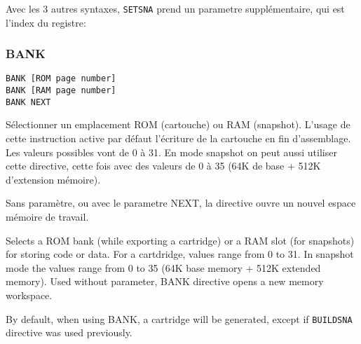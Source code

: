 \begin{xfr}
Avec les 3 autres syntaxes, \texttt{SETSNA} prend un parametre supplémentaire, qui est l'index du registre:
\end{xfr}














\subsubsection{BANK}\label{BANK}
\begin{verbatim}
BANK [ROM page number]
BANK [RAM page number]
BANK NEXT
\end{verbatim}

\begin{xfr}
Sélectionner un emplacement ROM (cartouche) ou RAM (snapshot). L'usage de cette instruction active par défaut l'écriture de la cartouche en fin d'assemblage.
Les valeurs possibles vont de 0 à 31. En mode snapshot on peut aussi utiliser cette directive, cette fois avec des valeurs de 0 à 35 (64K de base + 512K d'extension mémoire).

Sans paramètre, ou avec le parametre NEXT, la directive ouvre un nouvel espace mémoire de travail.
\end{xfr}

\begin{xen}
Selects a ROM bank (while exporting a cartridge) or a RAM slot (for snapshots) for storing code or data.
For a cartdridge, values range from 0 to 31. In snapshot mode the values range from 0 to 35 (64K base memory + 512K extended memory).
Used without parameter, BANK directive opens a new memory workspace.

By default, when using BANK, a cartridge will be generated, except if \texttt{BUILDSNA} directive was used previously.

\end{xen}

